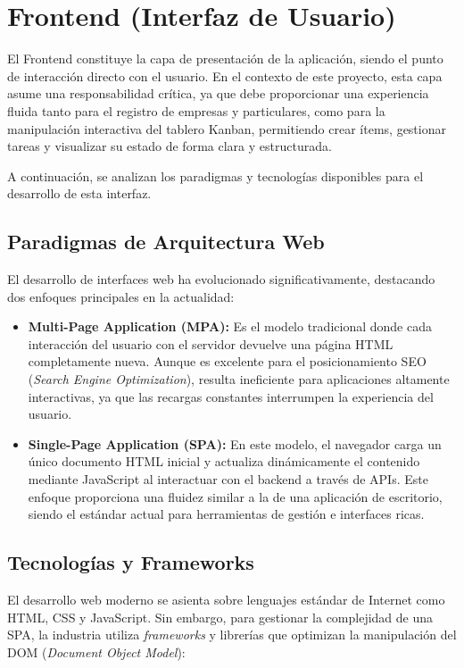 \documentclass[12pt, a4paper]{book}
\begin{document}
\section{Frontend (Interfaz de Usuario)}

El Frontend constituye la capa de presentación de la aplicación, siendo el punto de interacción directo con el usuario. En el contexto de este proyecto, esta capa asume una responsabilidad crítica, ya que debe proporcionar una experiencia fluida tanto para el registro de empresas y particulares, como para la manipulación interactiva del tablero Kanban, permitiendo crear ítems, gestionar tareas y visualizar su estado de forma clara y estructurada.

A continuación, se analizan los paradigmas y tecnologías disponibles para el desarrollo de esta interfaz.

\subsection{Paradigmas de Arquitectura Web}

El desarrollo de interfaces web ha evolucionado significativamente, destacando dos enfoques principales en la actualidad:

\begin{itemize}
    \item \textbf{Multi-Page Application (MPA):} Es el modelo tradicional donde cada interacción del usuario con el servidor devuelve una página HTML completamente nueva. Aunque es excelente para el posicionamiento SEO (\textit{Search Engine Optimization}), resulta ineficiente para aplicaciones altamente interactivas, ya que las recargas constantes interrumpen la experiencia del usuario.
    
    \item \textbf{Single-Page Application (SPA):} En este modelo, el navegador carga un único documento HTML inicial y actualiza dinámicamente el contenido mediante JavaScript al interactuar con el backend a través de APIs. Este enfoque proporciona una fluidez similar a la de una aplicación de escritorio, siendo el estándar actual para herramientas de gestión e interfaces ricas.
\end{itemize}

\subsection{Tecnologías y Frameworks}

El desarrollo web moderno se asienta sobre lenguajes estándar de Internet como HTML, CSS y JavaScript. Sin embargo, para gestionar la complejidad de una SPA, la industria utiliza \textit{frameworks} y librerías que optimizan la manipulación del DOM (\textit{Document Object Model}):
\end{document}
